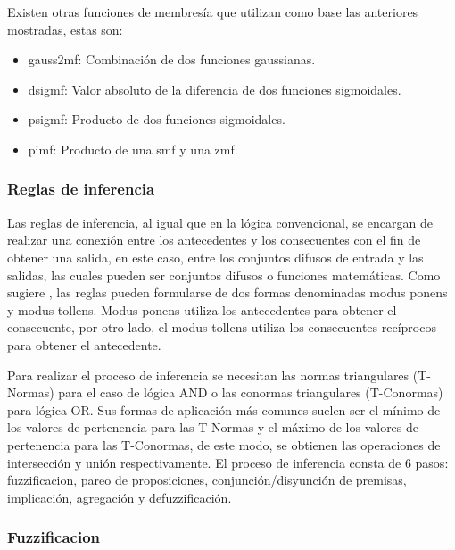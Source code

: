             Existen otras funciones de membresía que utilizan como base las anteriores mostradas, estas son:

            \begin{itemize}[leftmargin=\parindent]
                \item gauss2mf: Combinación de dos funciones gaussianas.
                \item dsigmf: Valor absoluto de la diferencia de dos funciones sigmoidales.
                \item psigmf: Producto de dos funciones sigmoidales.
                \item pimf: Producto de una smf y una zmf.
            \end{itemize}

        
        \subsubsection{Reglas de inferencia}
            
            Las reglas de inferencia, al igual que en la lógica convencional, se encargan de realizar una conexión entre los antecedentes y los consecuentes con el fin de obtener una salida, en este caso, entre los conjuntos difusos de entrada y las salidas, las cuales pueden ser conjuntos difusos o funciones matemáticas. Como sugiere \textcite{cruz2010inteligencia}, las reglas pueden formularse de dos formas denominadas modus ponens y modus tollens. Modus ponens utiliza los antecedentes para obtener el consecuente, por otro lado, el modus tollens utiliza los consecuentes recíprocos para obtener el antecedente.
                        
            Para realizar el proceso de inferencia se necesitan las normas triangulares (T-Normas) para el caso de lógica AND o las conormas triangulares (T-Conormas) para lógica OR. Sus formas de aplicación más comunes suelen ser el mínimo de los valores de pertenencia para las T-Normas y el máximo de los valores de pertenencia para las T-Conormas, de este modo, se obtienen las operaciones de intersección y unión respectivamente. El proceso de inferencia consta de 6 pasos: fuzzificacion, pareo de proposiciones, conjunción/disyunción de premisas, implicación, agregación y defuzzificación.

        \subsubsection{Fuzzificacion}
            
